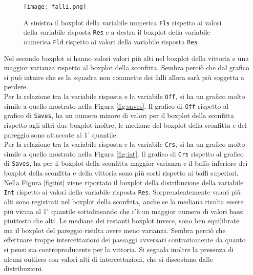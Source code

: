 \begin{figure}[htbp]
	\begin{center}
		\texttt{[image: falli.png]}
		\caption{A sinistra il boxplot della variabile numerica \texttt{Fls} rispetto ai valori della variabile risposta \texttt{Res} e a destra il boxplot della variabile numerica \texttt{Fld} rispetto ai valori della variabile risposta \texttt{Res}} \label{fig:falli}
	\end{center}
\end{figure}

Nel secondo boxplot si hanno valori valori più alti nel boxplot della vittoria e una maggior varianza rispetto al boxplot della sconfitta. Sembra perciò che dal grafico si può intuire che se la squadra non commette dei falli allora sarà più soggetta a perdere.\\

Per la relazione tra la variabile risposta e la variabile \texttt{Off}, si ha un grafico molto simile a quello mostrato nella Figura \ref{fig:saves}. Il grafico di \texttt{Off} rispetto al grafico di \texttt{Saves}, ha un numero minore di valori per il boxplot della sconfitta rispetto agli altri due boxplot inoltre, le mediane del boxplot della sconfitta e del pareggio sono attaccate al 1$^{\circ}$ quantile.\\

Per la relazione tra la variabile risposta e la variabile \texttt{Crs}, si ha un grafico molto simile a quello mostrato nella Figura \ref{fig:int}. Il grafico di \texttt{Crs} rispetto al grafico di \texttt{Saves}, ha per il boxplot della sconfitta maggior varianza e il baffo inferiore dei boxplot della sconfitta e della vittoria sono più corti rispetto ai baffi superiori.\\

Nella Figura \ref{fig:int} viene riportato il boxplot della distribuzione della variabile \texttt{Int} rispetto ai valori della variabile risposta \texttt{Res}. Sorprendentemente valori più alti sono registrati nel boxplot della sconfitta, anche se la mediana risulta essere più vicina al 1$^{\circ}$ quantile sottolineando che c'è un maggior numero di valori bassi piuttosto che alti. Le mediane dei restanti boxplot invece, sono ben equilibrate ma il boxplot del pareggio risulta avere meno varianza. Sembra perciò che effettuare troppe intercettazioni dei passaggi avversari contrariamente da quanto si pensi sia controproducente per la vittoria. Si segnala inoltre la presenza di alcuni outliers con valori alti di intercettazioni, che si discostano dalle distribuzioni.\\

